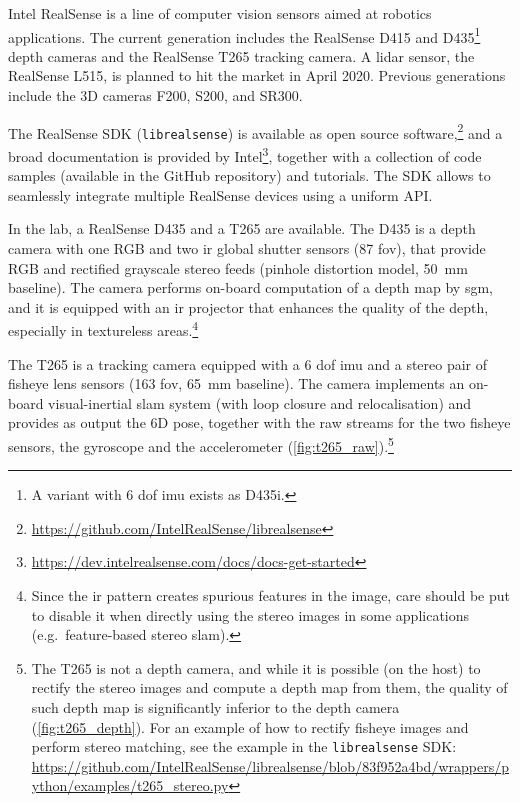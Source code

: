 \documentclass[11pt, letterpaper, twoside]{article}
\begin{document}
Intel RealSense is a line of computer vision sensors aimed at robotics
applications. The current generation includes the RealSense D415 and
D435\footnote{A variant with 6 \gls{dof} \gls{imu} exists as D435i.} depth
cameras and the RealSense T265 tracking camera. A lidar sensor, the RealSense
L515, is planned to hit the market in April 2020. Previous generations include
the 3D cameras F200, S200, and SR300.

The RealSense SDK (\texttt{librealsense}) is available as open source
software,\footnote{\url{https://github.com/IntelRealSense/librealsense}} and a
broad documentation is provided by
Intel\footnote{\url{https://dev.intelrealsense.com/docs/docs-get-started}},
together with a collection of code samples (available in the GitHub repository)
and tutorials. The SDK allows to seamlessly integrate multiple RealSense
devices using a uniform API.

In the lab, a RealSense D435 and a T265 are available. The D435 is a depth
camera with one RGB and two \gls{ir} global shutter sensors (87\textdegree{}
\gls{fov}), that provide RGB and rectified grayscale stereo feeds (pinhole
distortion model, 50~mm baseline). The camera performs on-board computation of a
depth map by \gls{sgm}, and it is equipped with an \gls{ir} projector that
enhances the quality of the depth, especially in textureless
areas.\footnote{Since the \gls{ir} pattern creates spurious features in the
    image, care should be put to disable it when directly using the stereo
    images in some applications (e.g.\ feature-based stereo \gls{slam}).}

The T265 is a tracking camera equipped with a 6 \gls{dof} \gls{imu} and a
stereo pair of fisheye lens sensors (163\textdegree{} \gls{fov}, 65~mm
baseline). The camera implements an on-board visual-inertial \gls{slam} system
(with loop closure and relocalisation) and provides as output the 6D pose,
together with the raw streams for the two fisheye sensors, the gyroscope and
the accelerometer (\cref{fig:t265_raw}).\footnote{The T265 is not a depth
camera, and while it is possible (on the host) to rectify the stereo images
and compute a depth map from them, the quality of such depth map is
significantly inferior to the depth camera (\cref{fig:t265_depth}). For an
example of how to rectify fisheye images and perform stereo matching,
see the example in the \texttt{librealsense} SDK:
\url{https://github.com/IntelRealSense/librealsense/blob/83f952a4bd/wrappers/python/examples/t265_stereo.py}}
\end{document}
